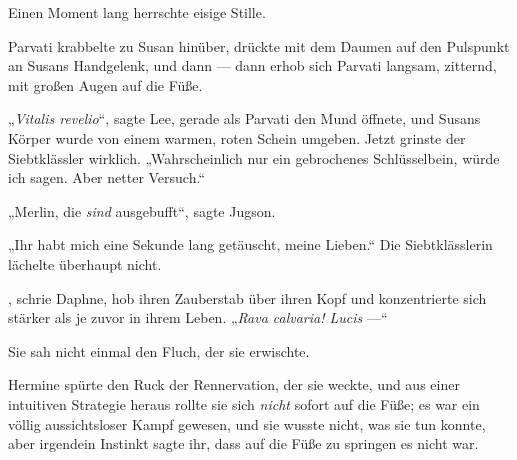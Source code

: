Einen Moment lang herrschte eisige Stille.

Parvati krabbelte zu Susan hinüber, drückte mit dem Daumen auf den Pulspunkt an Susans Handgelenk, und dann — dann erhob sich Parvati langsam, zitternd, mit großen Augen auf die Füße.

„\emph{Vitalis revelio}“, sagte Lee, gerade als Parvati den Mund öffnete, und Susans Körper wurde von einem warmen, roten Schein umgeben. Jetzt grinste der Siebtklässler wirklich.
„Wahrscheinlich nur ein gebrochenes Schlüsselbein, würde ich sagen. Aber netter Versuch.“

„Merlin, die \emph{sind} ausgebufft“, sagte Jugson.

„Ihr habt mich eine Sekunde lang getäuscht, meine Lieben.“ Die Siebtklässlerin lächelte überhaupt nicht.

, schrie Daphne, hob ihren Zauberstab über ihren Kopf und konzentrierte sich stärker als je zuvor in ihrem Leben.
„\emph{Rava calvaria! Lucis} —“

Sie sah nicht einmal den Fluch, der sie erwischte.

\later

Hermine spürte den Ruck der Rennervation, der sie weckte, und aus einer intuitiven Strategie heraus rollte sie sich \emph{nicht} sofort auf die Füße; es war ein völlig aussichtsloser Kampf gewesen, und sie wusste nicht, was sie tun konnte, aber irgendein Instinkt sagte ihr, dass auf die Füße zu springen es nicht war.

